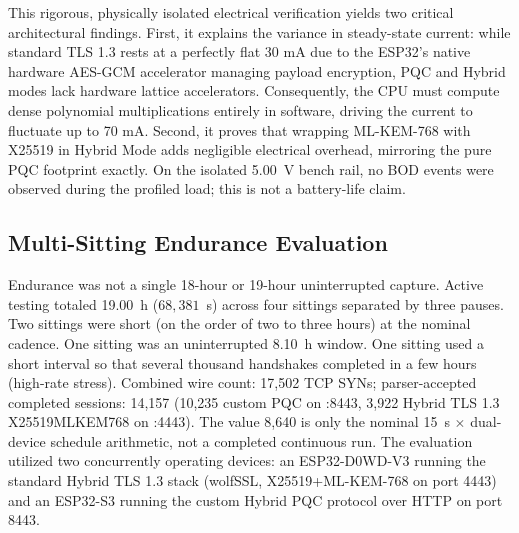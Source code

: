 \documentclass[journal, 10pt]{IEEEtran}
\begin{document}
\begin{table}[htbp]
\caption{Comparative Electrical Power Profile (Isolated UNI-T UTP1310 Bench Supply, 5.00V)}
\begin{center}
\label{tab:power}
\end{center}
\end{table}

This rigorous, physically isolated electrical verification yields two critical architectural findings. First, it explains the variance in steady-state current: while standard TLS 1.3 rests at a perfectly flat 30 mA due to the ESP32's native hardware AES-GCM accelerator managing payload encryption, PQC and Hybrid modes lack hardware lattice accelerators. Consequently, the CPU must compute dense polynomial multiplications entirely in software, driving the current to fluctuate up to 70 mA. Second, it proves that wrapping ML-KEM-768 with X25519 in Hybrid Mode adds negligible electrical overhead, mirroring the pure PQC footprint exactly. On the isolated 5.00~V bench rail, no BOD events were observed during the profiled load; this is not a battery-life claim.


\subsection{Multi-Sitting Endurance Evaluation}
Endurance was not a single 18-hour or 19-hour uninterrupted capture. Active testing totaled 19.00~h ($68{,}381$~s) across four sittings separated by three pauses. Two sittings were short (on the order of two to three hours) at the nominal cadence. One sitting was an uninterrupted 8.10~h window. One sitting used a short interval so that several thousand handshakes completed in a few hours (high-rate stress). Combined wire count: 17,502 TCP SYNs; parser-accepted completed sessions: 14,157 (10,235 custom PQC on :8443, 3,922 Hybrid TLS 1.3 X25519MLKEM768 on :4443). The value 8,640 is only the nominal 15~s $\times$ dual-device schedule arithmetic, not a completed continuous run. The evaluation utilized two concurrently operating devices: an ESP32-D0WD-V3 running the standard Hybrid TLS 1.3 stack (wolfSSL, X25519+ML-KEM-768 on port 4443) and an ESP32-S3 running the custom Hybrid PQC protocol over HTTP on port 8443.
\end{document}
